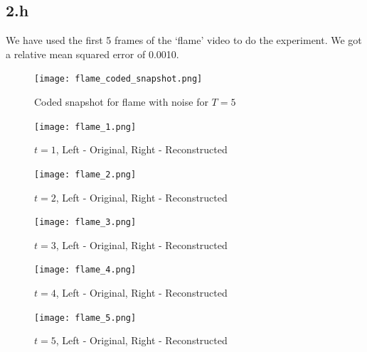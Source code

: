 \documentclass[12pt]{article}
\begin{document}
\subsection*{2.h}
We have used the first 5 frames of the `flame' video to do the experiment. We got a relative mean squared error of 0.0010.
\begin{figure}[ht]
	\centering
	\texttt{[image: flame\_coded\_snapshot.png]}
	\caption{Coded snapshot for flame with noise for $T = 5$}
\end{figure}
\begin{figure}[ht]
	\centering
		\texttt{[image: flame\_1.png]}
		\caption{$t = 1$, Left - Original, Right - Reconstructed}
\end{figure}
\begin{figure}[ht]
	\centering
	\texttt{[image: flame\_2.png]}
	\caption{$t = 2$, Left - Original, Right - Reconstructed}
\end{figure}
\newpage
\begin{figure}[ht]
	\centering
	\texttt{[image: flame\_3.png]}
	\caption{$t = 3$, Left - Original, Right - Reconstructed}
\end{figure}
\begin{figure}[ht]
	\centering
	\texttt{[image: flame\_4.png]}
	\caption{$t = 4$, Left - Original, Right - Reconstructed}
\end{figure}
\begin{figure}[ht]
	\centering
	\texttt{[image: flame\_5.png]}
	\caption{$t = 5$, Left - Original, Right - Reconstructed}
\end{figure}
\newpage
\end{document}
